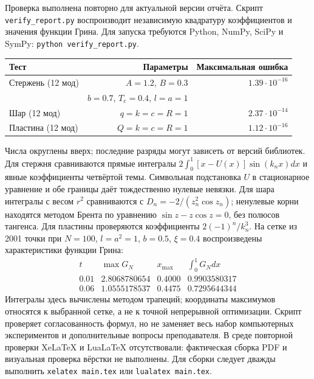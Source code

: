 Проверка выполнена повторно для актуальной версии отчёта.
Скрипт \texttt{verify\_report.py} воспроизводит независимую квадратуру
коэффициентов и значения функции Грина. Для запуска требуются Python,
NumPy, SciPy и SymPy: \texttt{python verify\_report.py}.
\begin{center}
\begin{tabular}{lrr}
Тест & Параметры & Максимальная ошибка\\\hline
Стержень (12 мод) & $A=1.2$, $B=0.3$ & $1.39\cdot10^{-16}$\\
 & $b=0.7$, $T_e=0.4$, $l=a=1$ & \\
Шар (12 мод) & $q=k=c=R=1$ & $2.37\cdot10^{-14}$\\
Пластина (12 мод) & $Q=k=c=R=1$ & $1.12\cdot10^{-16}$
\end{tabular}
\end{center}
Числа округлены вверх; последние разряды могут зависеть от версий библиотек.
Для стержня сравниваются прямые интегралы
$2\int_0^1[x-U(x)]\sin(k_nx)dx$ и явные коэффициенты четвёртой темы.
Символьная подстановка $U$ в стационарное уравнение и обе границы
даёт тождественно нулевые невязки.
Для шара интегралы с весом $r^2$ сравниваются с
$D_n=-2/(z_n^2\cos z_n)$; ненулевые корни находятся методом Брента
по уравнению $\sin z-z\cos z=0$, без полюсов тангенса.
Для пластины проверяются коэффициенты $2(-1)^n/k_n^3$.
На сетке из 2001 точки при $N=100$, $l=a^2=1$, $b=0.5$, $\xi=0.4$
воспроизведены характеристики функции Грина:
\[
\begin{array}{c|ccc}
t&\max G_N&x_{\max}&\int_0^1G_Ndx\\\hline
0.01&2.8068780654&0.4000&0.9903580317\\
0.06&1.0555178537&0.4475&0.7295644344
\end{array}
\]
Интегралы здесь вычислены методом трапеций; координаты максимумов
относятся к выбранной сетке, а не к точной непрерывной оптимизации.
Скрипт проверяет согласованность формул, но не заменяет весь набор
компьютерных экспериментов и дополнительные вопросы преподавателя.
В среде повторной проверки XeLaTeX и LuaLaTeX отсутствовали:
фактическая сборка PDF и визуальная проверка вёрстки не выполнены.
Для сборки следует дважды выполнить \texttt{xelatex main.tex}
или \texttt{lualatex main.tex}.
